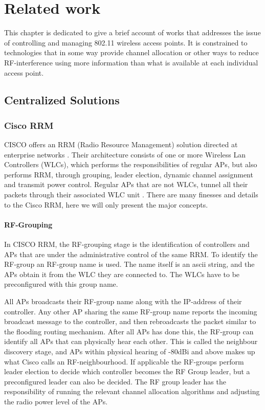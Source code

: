 \chapter{Related work}
This chapter is dedicated to give a brief account of works that addresses the issue of controlling and managing 802.11 wireless access points. It is constrained
to technologies that in some way provide channel allocation or other ways to reduce RF-interference using more information than what is available at each individual access point.

\section{Centralized Solutions}

\subsection{Cisco RRM}
CISCO offers an RRM (Radio Resource Management) solution directed at enterprise networks \cite{ciscoRRM}.
Their architecture consists of one or more Wireless Lan Controllers (WLCs), which performs the responsibilities of regular APs, 
but also performs RRM, through grouping, leader election, dynamic channel assignment and transmit power control. Regular APs that 
are not WLCs, tunnel all their packets through their associated WLC unit \cite{cisco_2009}. There are many finesses and details to the Cisco RRM, here we will only present the
major concepts.

\subsubsection{RF-Grouping}
In CISCO RRM, the RF-grouping stage is the identification of controllers and APs that are under the administrative control of the same RRM. 
To identify the RF-group an RF-group name is used. The name itself is an ascii string, and the APs obtain it from the WLC they are connected to. The WLCs have to be preconfigured with this group name.

All APs broadcasts their RF-group name along with the IP-address of their controller.
Any other AP sharing the same RF-group name reports the incoming broadcast message to the controller, and then rebroadcasts the packet similar to the flooding routing mechanism.
After all APs has done this, the RF-group can identify all APs that can physically hear each other.
This is called the neighbour discovery stage, and APs within physical hearing of -80dBi and above makes up what Cisco calls an RF-neighbourhood.
If applicable the RF-groups perform leader election to decide which controller becomes the RF Group leader, but a preconfigured leader can also be decided.
The RF group leader has the responsibility of running the relevant channel allocation algorithms and adjusting the radio power level of the APs. 

